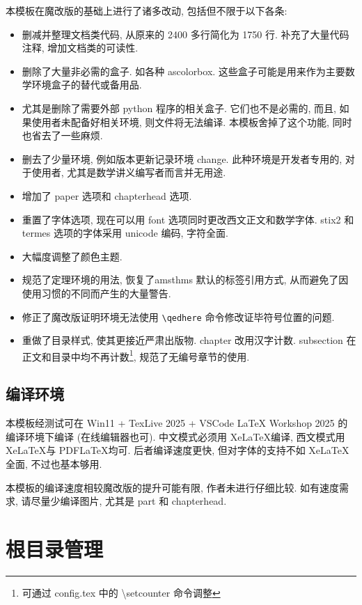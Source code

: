 \documentclass[../book.tex]{subfiles}
\begin{document}
本模板在魔改版的基础上进行了诸多改动, 包括但不限于以下各条:
\begin{itemize}
    \item 删减并整理文档类代码, 从原来的 2400 多行简化为 1750 行. 补充了大量代码注释, 增加文档类的可读性.
    \item 删除了大量非必需的盒子. 如各种 ascolorbox. 这些盒子可能是用来作为主要数学环境盒子的替代或备用品. 
    \item 尤其是删除了需要外部 python 程序的相关盒子. 它们也不是必需的, 而且, 如果使用者未配备好相关环境, 则文件将无法编译. 本模板舍掉了这个功能, 同时也省去了一些麻烦.
    \item 删去了少量环境, 例如版本更新记录环境 change. 此种环境是开发者专用的, 对于使用者, 尤其是数学讲义编写者而言并无用途.
    \item 增加了 paper 选项和 chapterhead 选项.
    \item 重置了字体选项, 现在可以用 font 选项同时更改西文正文和数学字体. stix2 和 termes 选项的字体采用 unicode 编码, 字符全面.
    \item 大幅度调整了颜色主题. 
    \item 规范了定理环境的用法, 恢复了amsthms 默认的标签引用方式, 从而避免了因使用习惯的不同而产生的大量警告. 
    \item 修正了魔改版证明环境无法使用 \texttt{\textbackslash qedhere} 命令修改证毕符号位置的问题.
    \item 重做了目录样式, 使其更接近严肃出版物. chapter 改用汉字计数. subsection 在正文和目录中均不再计数\footnote{可通过 config.tex 中的 \textbackslash setcounter 命令调整}, 规范了无编号章节的使用.
\end{itemize}

    \subsection{编译环境}

本模板经测试可在 Win11 + TexLive 2025 + VSCode LaTeX Workshop 2025 的编译环境下编译 (在线编辑器也可). 中文模式必须用 Xe\LaTeX{}编译, 西文模式用 Xe\LaTeX 与 PDF\LaTeX{}均可. 后者编译速度更快, 但对字体的支持不如 Xe\LaTeX 全面, 不过也基本够用. 

本模板的编译速度相较魔改版的提升可能有限, 作者未进行仔细比较. 如有速度需求, 请尽量少编译图片, 尤其是 part 和 chapterhead.

\section{根目录管理}
\end{document}
